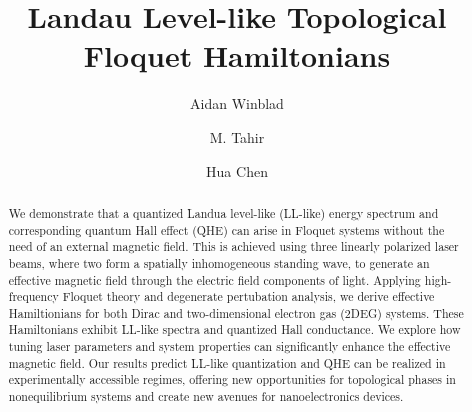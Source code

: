 \documentclass[aps,prb,twocolumn,showpacs,superscriptaddress]{revtex4-2}
\newcommand{\Blue}[1]{\textcolor{blue}{#1}}
\begin{document}
\title{Landau Level-like Topological Floquet Hamiltonians}

\author{Aidan Winblad}

\author{M. Tahir}

\author{Hua Chen}

\begin{abstract}
We demonstrate that a quantized Landua level-like (LL-like) energy spectrum and corresponding quantum Hall effect (QHE) can arise in Floquet systems without the need of an external magnetic field.
This is achieved using three linearly polarized laser beams, where two form a spatially inhomogeneous standing wave, to generate an effective magnetic field through the electric field components of light.
Applying high-frequency Floquet theory and degenerate pertubation analysis, we derive effective Hamiltionians for both Dirac and two-dimensional electron gas (2DEG) systems.
These Hamiltonians exhibit LL-like spectra and quantized Hall conductance.
We explore how tuning laser parameters and system properties can significantly enhance the effective magnetic field.
Our results predict LL-like quantization and QHE can be realized in experimentally accessible regimes, offering new opportunities for topological phases in nonequilibrium systems and create new avenues for nanoelectronics devices.
\end{abstract}
\end{document}
